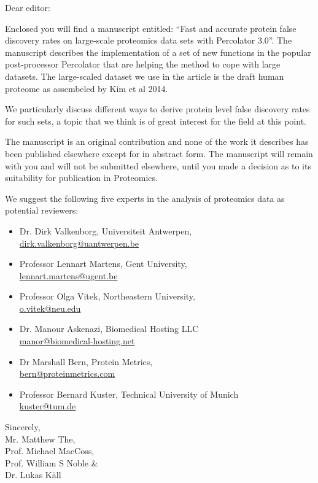 \documentclass[a4paper]{letter}
\begin{document}
\begin{letter}{}
\vspace*{-5.0cm}

\opening{Dear editor:}

Enclosed you will find a manuscript entitled: ``Fast and accurate
protein false discovery rates on large-scale proteomics data sets with
Percolator 3.0''. The manuscript describes the implementation of a set
of new functions in the popular post-processor Percolator that are
helping the method to cope with large datasets. The large-scaled
dataset we use in the article is the draft human proteome as
assembeled by Kim et al 2014. 

We particularly discuss different ways to derive protein level false
discovery rates for such sets, a topic that we think is of great
interest for the field at this point.


The manuscript is an original contribution and none of the work it
describes has been published elsewhere except for in abstract
form. The manuscript will remain with you and will not be submitted
elsewhere, until you made a decision as to its suitability for
publication in Proteomics.

We suggest the following five experts in the analysis of proteomics
data as potential reviewers:

\begin{itemize}

\item Dr. Dirk Valkenborg, Universiteit Antwerpen,\\
\url{dirk.valkenborg@uantwerpen.be}

\item Professor Lennart Martens,
Gent University, \\
\url{lennart.martens@ugent.be}

\item Professor Olga Vitek,
      Northeastern University, \\
\url{o.vitek@neu.edu}

\item Dr. Manour Askenazi, Biomedical Hosting LLC\\
\url{manor@biomedical-hosting.net}

\item Dr Marshall Bern, Protein Metrics, \\
\url{bern@proteinmetrics.com}

\item Professor Bernard Kuster, Technical University of Munich\\
\url{kuster@tum.de}

\end{itemize}

\vspace*{1.5em}

Sincerely,\\[2em]
Mr. Matthew The,\\
Prof. Michael MacCoss,\\
Prof. William S Noble \& \\
Dr. Lukas K\"all

\end{letter}
\end{document}
